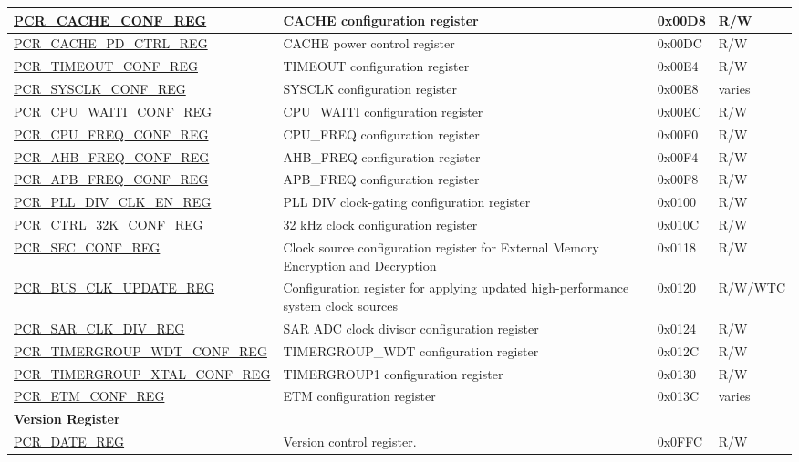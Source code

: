 \begin{longtable}{ | p{7cm} | p{6.2cm} | p{1.3cm} | p{1cm} | }
\hyperref[regdesc:PCRCACHECONFREG]{PCR\_CACHE\_CONF\_REG} & CACHE configuration register & 0x00D8 & R/W \\ \hline
\hyperref[regdesc:PCRCACHEPDCTRLREG]{PCR\_CACHE\_PD\_CTRL\_REG} & CACHE power control register & 0x00DC & R/W \\ \hline
\hyperref[regdesc:PCRTIMEOUTCONFREG]{PCR\_TIMEOUT\_CONF\_REG} & TIMEOUT configuration register & 0x00E4 & R/W \\ \hline
\hyperref[regdesc:PCRSYSCLKCONFREG]{PCR\_SYSCLK\_CONF\_REG} & SYSCLK configuration register & 0x00E8 & varies \\ \hline
\hyperref[regdesc:PCRCPUWAITICONFREG]{PCR\_CPU\_WAITI\_CONF\_REG} & CPU\_WAITI configuration register & 0x00EC & R/W \\ \hline
\hyperref[regdesc:PCRCPUFREQCONFREG]{PCR\_CPU\_FREQ\_CONF\_REG} & CPU\_FREQ configuration register & 0x00F0 & R/W \\ \hline
\hyperref[regdesc:PCRAHBFREQCONFREG]{PCR\_AHB\_FREQ\_CONF\_REG} & AHB\_FREQ configuration register & 0x00F4 & R/W \\ \hline
\hyperref[regdesc:PCRAPBFREQCONFREG]{PCR\_APB\_FREQ\_CONF\_REG} & APB\_FREQ configuration register & 0x00F8 & R/W \\ \hline
\hyperref[regdesc:PCRPLLDIVCLKENREG]{PCR\_PLL\_DIV\_CLK\_EN\_REG} & PLL DIV clock-gating configuration register & 0x0100 & R/W \\ \hline
\hyperref[regdesc:PCRCTRL32KCONFREG]{PCR\_CTRL\_32K\_CONF\_REG} & 32 kHz clock configuration register & 0x010C & R/W \\ \hline
\hyperref[regdesc:PCRSECCONFREG]{PCR\_SEC\_CONF\_REG} & Clock source configuration register for External Memory Encryption and Decryption & 0x0118 & R/W \\ \hline
\hyperref[regdesc:PCRBUSCLKUPDATEREG]{PCR\_BUS\_CLK\_UPDATE\_REG} & Configuration register for applying updated high-performance system clock sources & 0x0120 & R/W/WTC \\ \hline
\hyperref[regdesc:PCRSARCLKDIVREG]{PCR\_SAR\_CLK\_DIV\_REG} & SAR ADC clock divisor configuration register & 0x0124 & R/W \\ \hline
\hyperref[regdesc:PCRTIMERGROUPWDTCONFREG]{PCR\_TIMERGROUP\_WDT\_CONF\_REG} & TIMERGROUP\_WDT configuration register & 0x012C & R/W \\ \hline
\hyperref[regdesc:PCRTIMERGROUPXTALCONFREG]{PCR\_TIMERGROUP\_XTAL\_CONF\_REG} & TIMERGROUP1 configuration register & 0x0130 & R/W \\ \hline
\hyperref[regdesc:PCRETMCONFREG]{PCR\_ETM\_CONF\_REG} & ETM configuration register & 0x013C & varies \\ \hline
\multicolumn{4}{|l|}{\textbf{Version Register}} \\ \hline
\hyperref[regdesc:PCRDATEREG]{PCR\_DATE\_REG} & Version control register. & 0x0FFC & R/W \\ \hline
\end{longtable}
